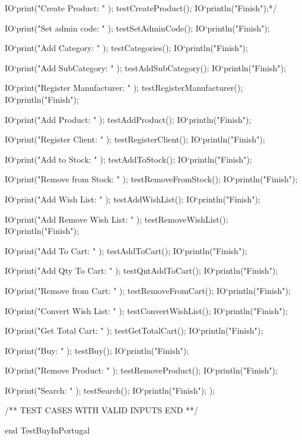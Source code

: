\begin{vdmpp}[breaklines=true]
    IO`print("Create Product: " );
    testCreateProduct();
    IO`println("Finish");*/
    
    IO`print("Set admin code: " );
    testSetAdminCode();
    IO`println("Finish");
    
    IO`print("Add Category: " );
    testCategories();
    IO`println("Finish");
    
    IO`print("Add SubCategory: " );
    testAddSubCategory();
    IO`println("Finish");
    
    IO`print("Register Manufacturer: " );
    testRegisterManufacturer();
    IO`println("Finish");
    
   IO`print("Add Product: " );
    testAddProduct();
    IO`println("Finish");
    
    IO`print("Register Client: " );
    testRegisterClient();
    IO`println("Finish");

    IO`print("Add to Stock: " );
    testAddToStock();
    IO`println("Finish");
    
    IO`print("Remove from Stock: " );
    testRemoveFromStock();
    IO`println("Finish");
    
    IO`print("Add Wish List: " );
    testAddWishList();
    IO`println("Finish");

   IO`print("Add Remove Wish List: " );
    testRemoveWishList();
    IO`println("Finish");
    
    IO`print("Add To Cart: " );
    testAddToCart();
    IO`println("Finish");

    IO`print("Add Qty To Cart: " );
    testQntAddToCart();
    IO`println("Finish");

   IO`print("Remove from Cart: " );
    testRemoveFromCart();
    IO`println("Finish");
    
    IO`print("Convert Wish List: " );
    testConvertWishList();
    IO`println("Finish");

   IO`print("Get Total Cart: " );
    testGetTotalCart();
    IO`println("Finish");

   IO`print("Buy: " );
    testBuy();
    IO`println("Finish");

   IO`print("Remove Product: " );
    testRemoveProduct();
    IO`println("Finish");

   IO`print("Search: " );
    testSearch();
    IO`println("Finish");
  );
  
 
 /** TEST CASES WITH VALID INPUTS END **/

end TestBuyInPortugal
\end{vdmpp}
\bigskip
